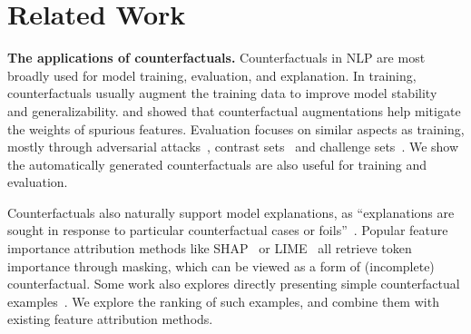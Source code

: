 \section{Related Work}
\label{sec:relate}

\textbf{The applications of counterfactuals.}
Counterfactuals in NLP are most broadly used for model training, evaluation, and explanation.
In training, counterfactuals usually augment the training data to improve model stability~\cite{Wu2019ConditionalBC, Wei2019EDAED, Kumar2020DataAU} and generalizability.
\citet{kaushik2019learning} and \citet{teney2020learning} showed that counterfactual augmentations help mitigate the weights of spurious features.
Evaluation focuses on similar aspects as training, mostly through adversarial attacks~\cite{Song2020UniversalAA}, contrast sets~\cite{kaushik2019learning} and challenge sets~\cite{Geiger2019PosingFG, liu-etal-2019-inoculation}.
We show the automatically generated counterfactuals are also useful for training and evaluation.

Counterfactuals also naturally support model explanations, as ``explanations are sought in response to particular counterfactual cases or foils''~\cite{miller}.
Popular feature importance attribution methods like SHAP~\cite{NIPS2017_7062} or LIME~\cite{Ribeiro2016WhySI} all retrieve token importance through masking, which can be viewed as a form of (incomplete) counterfactual.
Some work also explores directly presenting simple counterfactual examples~\cite{hase2020evaluating, vig2020causal, kang2020counterfactual}.
We explore the ranking of such examples, and combine them with existing feature attribution methods.

